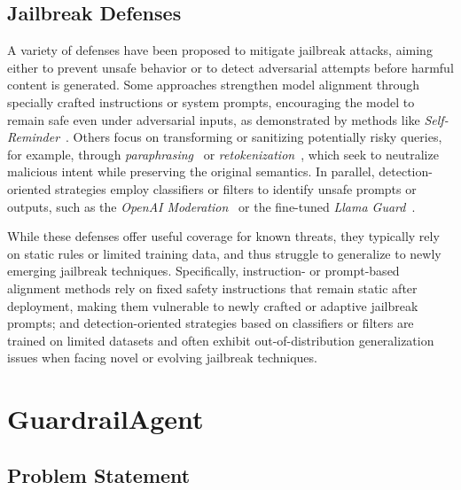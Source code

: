 \documentclass[letterpaper,twocolumn,10pt]{article}
\newcommand{\agentname}{GuardrailAgent\xspace}
\begin{document}
\subsection{Jailbreak Defenses}
\label{section:jailbreak_defense}

A variety of defenses have been proposed to mitigate jailbreak attacks, aiming either to prevent unsafe behavior or to detect adversarial attempts before harmful content is generated.
Some approaches strengthen model alignment through specially crafted instructions or system prompts, encouraging the model to remain safe even under adversarial inputs, as demonstrated by methods like \emph{Self-Reminder}~\cite{XYSCLCXW23}.
Others focus on transforming or sanitizing potentially risky queries, for example, through \emph{paraphrasing}~\cite{JSWSKCGSGG23} or \emph{retokenization}~\cite{JSWSKCGSGG23}, which seek to neutralize malicious intent while preserving the original semantics.
In parallel, detection-oriented strategies employ classifiers or filters to identify unsafe prompts or outputs, such as the \emph{OpenAI Moderation}~\cite{OpenAI_Moderation2} or the fine-tuned \emph{Llama Guard}~\cite{IUCRIMTHFTK23,Llama_Guard_2,llama_guard_3,llama_guard4}.

While these defenses offer useful coverage for known threats, they typically rely on static rules or limited training data, and thus struggle to generalize to newly emerging jailbreak techniques.
Specifically, instruction- or prompt-based alignment methods rely on fixed safety instructions that remain static after deployment, making them vulnerable to newly crafted or adaptive jailbreak prompts;
and detection-oriented strategies based on classifiers or filters are trained on limited datasets and often exhibit out-of-distribution generalization issues when facing novel or evolving jailbreak techniques.

\section{\agentname}
\label{section:agent}

\subsection{Problem Statement}
\end{document}

